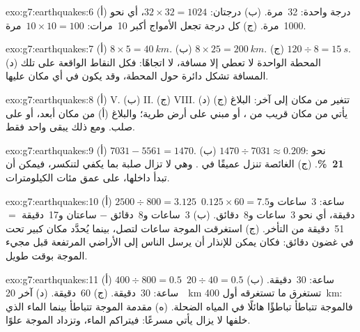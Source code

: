 \begin{solution}{exo:g7:earthquakes:6}
(أ) درجة واحدة: 32~مرة. (ب) درجتان: $32 \times 32 = 1024$، أي نحو
1000~مرة. (ج) كل درجة تجعل الأمواج أكبر 10~مرات: $10 \times 10 =
100$~مرة.
\end{solution}

\begin{solution}{exo:g7:earthquakes:7}
(أ) $8 \times 5 = \qty{40}{km}$. (ب) $8 \times 25 = \qty{200}{km}$. (ج)
$120 \div 8 = \qty{15}{s}$. (د) المحطة الواحدة لا تعطي إلا مسافة، لا
اتجاهًا: فكل النقاط الواقعة على تلك المسافة تشكل دائرة حول المحطة، وقد
يكون  في أي مكان عليها.
\end{solution}

\begin{solution}{exo:g7:earthquakes:8}
(أ) V. (ب) II. (ج) VIII. (د)  تتغير من مكان إلى آخر: البلاغ (ج)
يأتي من مكان قريب من ، أو مبني على أرض طرية؛ والبلاغ (أ) من
مكان أبعد، أو على  صلب. ومع ذلك يبقى   واحد فقط.
\end{solution}

\begin{solution}{exo:g7:earthquakes:9}
(أ) $7031 - 5561 = 1470$. (ب) $1470 \div 7031 \approx 0.209$: نحو
\textbf{21~\%}. (ج)  الغائصة تنزل عميقًا في . وهي لا تزال
صلبة بما يكفي لتنكسر، فيمكن أن تبدأ  داخلها، على عمق مئات
الكيلومترات.
\end{solution}

\begin{solution}{exo:g7:earthquakes:10}
(أ) $2500 \div 800 = 3.125$~ساعة: 3~ساعات و$0.125 \times 60 = 7.5$
دقيقة، أي نحو 3~ساعات و8~دقائق. (ب) 3~ساعات و8~دقائق $-$ ساعتان
و17~دقيقة $=$ 51~دقيقة من التأخر. (ج) استغرقت الموجة ساعات لتصل، بينما
يُحدَّد مكان  كبير تحت  في غضون دقائق: فكان يمكن للإنذار أن يرسل
الناس إلى الأراضي المرتفعة قبل مجيء الموجة بوقت طويل.
\end{solution}

\begin{solution}{exo:g7:earthquakes:11}
(أ) $400 \div 800 = 0.5$~ساعة: 30~دقيقة. (ب) $20 \div 40 = 0.5$~ساعة:
30~دقيقة. (ج) 60~دقيقة. (د) آخر \qty{20}{km} تستغرق ما تستغرقه أول
\qty{400}{km}: فالموجة تتباطأ تباطؤًا هائلًا في المياه الضحلة. (ه) مقدمة
الموجة تتباطأ بينما الماء الذي خلفها لا يزال يأتي مسرعًا: فيتراكم الماء،
وتزداد الموجة علوًا.
\end{solution}

